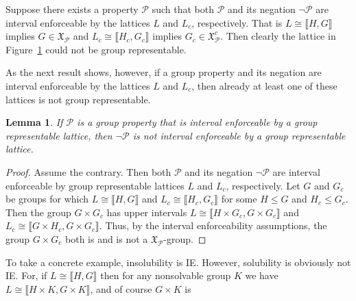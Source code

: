 \documentclass{gen-j-l}
\newcommand{\lb}{\ensuremath{\llbracket}}
\newcommand{\rb}{\ensuremath{\rrbracket}}
\newcommand{\<}{\ensuremath{\langle}}
\renewcommand{\>}{\ensuremath{\rangle}}
\theoremstyle{plain}
\newtheorem{lemma}[theorem]{Lemma}
\theoremstyle{definition}
\theoremstyle{remark}
\numberwithin{theorem}{section}
\numberwithin{claim}{section}
\numberwithin{equation}{section}
\numberwithin{conjecture}{section}
\renewcommand{\leq}{\ensuremath{\leqslant}}
\newcommand{\2}{\ensuremath{\mathbf{2}}}
\newcommand{\3}{\ensuremath{\mathbf{3}}}
\newcommand{\sG}{\ensuremath{\mathfrak{X}}}
\newcommand{\cP}{\ensuremath{\mathcal{P}}}
\newcommand{\IE}{{\small IE}}
\begin{document}
Suppose there exists a property $\cP$ such that both $\cP$ and
its negation $\neg \cP$ are interval enforceable by the lattices $L$ and $L_c$,
respectively.  That is $L\cong \lb H,G \rb$ implies $G \in \sG_\cP$ and 
$L_c\cong \lb H_c,G_c \rb$ implies $G_c\in \sG_\cP^c$.  Then clearly the
lattice in Figure~\ref{fig:twopanelchute} could not be group representable.  
\begin{figure}[!h]
  \centering
{}
\caption{}
\label{fig:twopanelchute}  
\end{figure}
As the next result shows, however, if a group property and its
negation are interval enforceable by the lattices $L$ and $L_c$, then already
at least one of these lattices is not group representable.
\begin{lemma}
\label{lemma:ie-prop-and-neg}
  If $\cP$ is a group property that is interval enforceable by a group representable lattice,
  then $\neg \cP$ is not interval enforceable by a group representable lattice.
\end{lemma}
\begin{proof}
Assume the contrary.  Then both $\cP$ and its negation $\neg \cP$
are interval enforceable by group representable lattices $L$ and $L_c$,
respectively. Let $G$ and $G_c$ be groups for which $L\cong \lb H,G \rb$ and $L_c\cong
\lb H_c,G_c \rb$ for some $H\leq G$ and $H_c\leq G_c$.
Then the group $G\times G_c$ has upper intervals 
$L\cong \lb H\times G_c, G\times G_c \rb$ and 
$L_c\cong \lb G\times H_c, G\times G_c \rb$.  Thus, by the interval enforceability
assumptions, the group $G\times G_c$ both is and is not a $\sG_\cP$-group. 
\end{proof}
To take a concrete example, insolubility is \IE.  However, solubility is
obviously not \IE. For, if $L\cong \lb H, G \rb$ then for any nonsolvable 
group $K$ we have $L\cong \lb H\times K, G\times K \rb$, and of course $G\times K$ is
\end{document}
